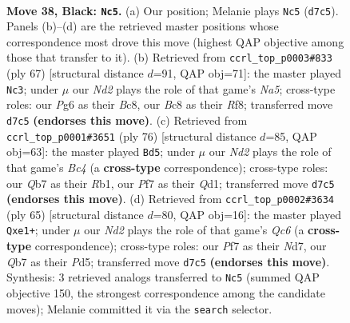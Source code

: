 \documentclass[11pt]{article}
\begin{document}
\clearpage

\begin{figure}[p]\centering
\begin{subfigure}{0.46\textwidth}\centering
\resizebox{\linewidth}{!}{%
\newchessgame
\chessboard[
  setfen={2b3k1/1q1nrp1p/6p1/1B2PpN1/p4P2/8/PQP2KPP/1R6 b - - 13 38},
  showmover=false,
  pgfstyle=straightmove, color=movearrow, markmove={d7-c5}
]}
\caption{}
\end{subfigure}\hfill
\begin{subfigure}{0.46\textwidth}\centering
\resizebox{\linewidth}{!}{%
\newchessgame
\chessboard[
  setfen={2b2r1k/6p1/p4p1p/P2Qp3/npB5/1P2P2P/q4PP1/3R2K1 b - - 3 34},
  showmover=false,
  pgfstyle=straightmove, color=movearrow, markmove={a4-c3}
]}
\caption{}
\end{subfigure}
\\[4pt]
\begin{subfigure}{0.46\textwidth}\centering
\resizebox{\linewidth}{!}{%
\newchessgame
\chessboard[
  setfen={1r2b1k1/4q2p/3pP3/4n1p1/2B1Np2/4P2P/1p3PP1/1R1Q2K1 w - - 2 39},
  showmover=false,
  pgfstyle=straightmove, color=movearrow, markmove={c4-d5}
]}
\caption{}
\end{subfigure}\hfill
\begin{subfigure}{0.46\textwidth}\centering
\resizebox{\linewidth}{!}{%
\newchessgame
\chessboard[
  setfen={6k1/2rn1p2/4p1p1/p2p3p/P2PN3/2q1P2P/4BPP1/1R2Q1K1 b - - 0 33},
  showmover=false,
  pgfstyle=straightmove, color=movearrow, markmove={c3-e1}
]}
\caption{}
\end{subfigure}
\caption{\textbf{Move 38, Black: \texttt{Nc5}.} (a) Our position; Melanie plays \texttt{Nc5} (\texttt{d7c5}). Panels (b)--(d) are the retrieved master positions whose correspondence most drove this move (highest QAP objective among those that transfer to it). (b) Retrieved from \texttt{ccrl\_top\_p0003\#833} (ply 67) [structural distance $d$=91, QAP obj=71]: the master played \texttt{Nc3}; under $\mu$ our \emph{Nd2} plays the role of that game's \emph{Na5}; cross-type roles: our \emph{P}g6 as their \emph{B}c8, our \emph{B}c8 as their \emph{R}f8; transferred move \texttt{d7c5} \textbf{(endorses this move)}. (c) Retrieved from \texttt{ccrl\_top\_p0001\#3651} (ply 76) [structural distance $d$=85, QAP obj=63]: the master played \texttt{Bd5}; under $\mu$ our \emph{Nd2} plays the role of that game's \emph{Bc4} (a \textbf{cross-type} correspondence); cross-type roles: our \emph{Q}b7 as their \emph{R}b1, our \emph{P}f7 as their \emph{Q}d1; transferred move \texttt{d7c5} \textbf{(endorses this move)}. (d) Retrieved from \texttt{ccrl\_top\_p0002\#3634} (ply 65) [structural distance $d$=80, QAP obj=16]: the master played \texttt{Qxe1+}; under $\mu$ our \emph{Nd2} plays the role of that game's \emph{Qc6} (a \textbf{cross-type} correspondence); cross-type roles: our \emph{P}f7 as their \emph{N}d7, our \emph{Q}b7 as their \emph{P}d5; transferred move \texttt{d7c5} \textbf{(endorses this move)}. Synthesis: 3 retrieved analogs transferred to \texttt{Nc5} (summed QAP objective 150, the strongest correspondence among the candidate moves); Melanie committed it via the \texttt{search} selector.}
\label{fig:thought-m75}
\end{figure}
\end{document}
